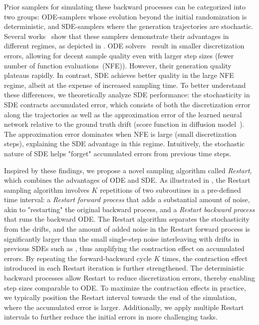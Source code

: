 Prior samplers for simulating these backward processes can be categorized into two groups: ODE-samplers whose evolution beyond the initial randomization is deterministic, and SDE-samplers where the generation trajectories are stochastic. Several works~\cite{Song2020ScoreBasedGM, JolicoeurMartineau2021GottaGF, Karras2022ElucidatingTD} show that these samplers demonstrate their advantages in different regimes, as depicted in . ODE solvers~\cite{Song2020DenoisingDI, lu2022dpm, Karras2022ElucidatingTD} result in smaller discretization errors, allowing for decent sample quality even with larger step sizes (\ie fewer number of function evaluations~(NFE)). However, their generation quality plateaus rapidly. In contrast, SDE achieves better quality in the large NFE regime, albeit at the expense of increased sampling time. To better understand these differences, we theoretically analyze SDE performance: the stochasticity in SDE contracts accumulated error, which consists of both the discretization error along the trajectories as well as the approximation error of the learned neural network relative to the ground truth drift (\eg score function in diffusion model~\cite{Song2020ScoreBasedGM}). The approximation error dominates when NFE is large (small discretization steps), explaining the SDE advantage in this regime. Intuitively, the stochastic nature of SDE helps "forget" accumulated errors from previous time steps.

Inspired by these findings, we propose a novel sampling algorithm called \textit{Restart}, which combines the advantages of ODE and SDE. As illustrated in , the Restart sampling algorithm involves $K$ repetitions of two subroutines in a pre-defined time interval: a \textit{Restart forward process} that adds a substantial amount of noise, akin to "restarting" the original backward process, and a \textit{Restart backward process} that 
runs the backward ODE. The Restart algorithm separates the stochasticity from the drifts, and the amount of added noise in the Restart forward process is significantly larger than the small single-step noise interleaving with drifts in previous SDEs such as \cite{Song2020ScoreBasedGM, Karras2022ElucidatingTD}, thus amplifying the contraction effect on accumulated errors. By repeating the forward-backward cycle $K$ times, the contraction effect introduced in each Restart iteration is further strengthened. The deterministic backward processes allow Restart to reduce discretization errors, thereby enabling step sizes comparable to ODE. To maximize the contraction effects in practice, we typically position the Restart interval towards the end of the simulation, where the accumulated error is larger. Additionally, we apply multiple Restart intervals to further reduce the initial errors in more challenging tasks.

